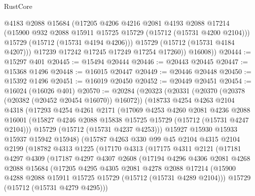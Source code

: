 \begin{lexlean}{RustCore}
\begin{coremodule}
              @4183
              @2088
              @15684
              (@17205
                @4206
                @4216
                @2081
                @4193
                @2088
                @17214
                (@15900 @932 @2088 @15911 @15725 @15729 (@15712 (@15731 @4200 @2104)))
                @15729
                (@15712 (@15731 @4194 @4206)))
              @15729
              (@15712 (@15731 @4184 @4207)))
            @17239
            @17242
            @17245
            @17249
            @17254
            @17260))
        @16008))
@20444 := @15297 @401
@20445 := @15494 @20444
@20446 := @20443 @20445
@20447 := @15368 @1496
@20448 := @16015 @20447
@20449 := @20446 @20448
@20450 := @15392 @1496
@20451 := @16019 @20450
@20452 := @20449 @20451
@20454 := @16024 (@16026 @401)
@20570 := @20284
    (@20323
      (@20331
        (@20370 (@20378 (@20382 (@20452 @20454 @16070)) @16072))
        (@18733
          @4254
          @4263
          @2104
          @4318
          (@17293
            @4254
            @4261
            @2171
            (@17069
              @4253
              @4260
              @2081
              @4236
              @2088
              @16001
              (@15827 @4246 @2088 @15838 @15725 @15729 (@15712 (@15731 @4247 @2104)))
              @15729
              (@15712 (@15731 @4237 @4253)))
            @15927
            @15930
            @15933
            @15937
            @15942
            @15948)
          (@15787
            @4263
            @330
            @99
            @45
            @2104
            @4315
            @2104
            @2199
            (@18782
              @4313
              @1225
              (@17170
                @4313
                (@17175
                  @4311
                  @2121
                  (@17181
                    @4297
                    @4309
                    (@17187
                      @4297
                      @4307
                      @2608
                      (@17194
                        @4296
                        @4306
                        @2081
                        @4268
                        @2088
                        @15684
                        (@17205
                          @4295
                          @4305
                          @2081
                          @4278
                          @2088
                          @17214
                          (@15900 @4288 @2088 @15911 @15725 @15729 (@15712 (@15731 @4289 @2104)))
                          @15729
                          (@15712 (@15731 @4279 @4295)))

\end{coremodule}
\end{lexlean}
